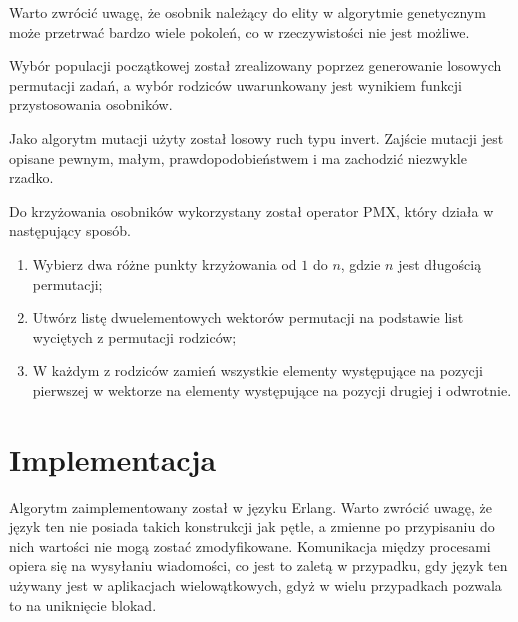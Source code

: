   Warto zwrócić uwagę, że osobnik należący do elity w algorytmie genetycznym
  może przetrwać bardzo wiele pokoleń, co w rzeczywistości nie jest możliwe.
  \vspace{1em}

  Wybór populacji początkowej został zrealizowany poprzez generowanie losowych
  permutacji zadań, a wybór rodziców uwarunkowany jest wynikiem funkcji
  przystosowania osobników.
  \vspace{1em}

  Jako algorytm mutacji użyty został losowy ruch typu invert. Zajście mutacji
  jest opisane pewnym, małym, prawdopodobieństwem i ma zachodzić niezwykle
  rzadko.
  \vspace{1em}

  Do krzyżowania osobników wykorzystany został operator PMX, który działa w
  następujący sposób.
  \begin{enumerate}
    \item Wybierz dwa różne punkty krzyżowania od $1$ do $n$, gdzie $n$ jest
          długością permutacji;
    \item Utwórz listę dwuelementowych wektorów permutacji na podstawie list
          wyciętych z permutacji rodziców;
    \item W każdym z rodziców zamień wszystkie elementy występujące na pozycji
          pierwszej w wektorze na elementy występujące na pozycji drugiej i
          odwrotnie.
  \end{enumerate}


\section{Implementacja} %
  \label{sec:impl}

  Algorytm zaimplementowany został w języku Erlang. Warto zwrócić uwagę, że
  język ten nie posiada takich konstrukcji jak pętle, a zmienne po przypisaniu
  do nich wartości nie mogą zostać zmodyfikowane. Komunikacja między procesami
  opiera się na wysyłaniu wiadomości, co jest to zaletą w przypadku,
  gdy język ten używany jest w aplikacjach wielowątkowych, gdyż w wielu
  przypadkach pozwala to na uniknięcie blokad.
  \vspace{1em}

